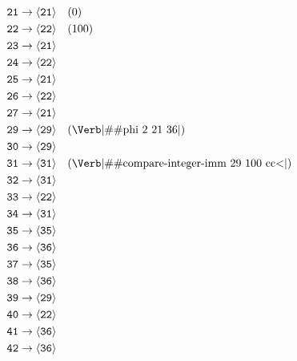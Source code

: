 \begin{align*}
  \texttt{21} &\to \vn{21} \quad (0)                                                \\
  \texttt{22} &\to \vn{22} \quad (100)                                              \\
  \texttt{23} &\to \vn{21}                                                          \\
  \texttt{24} &\to \vn{22}                                                          \\
  \texttt{25} &\to \vn{21}                                                          \\
  \texttt{26} &\to \vn{22}                                                          \\
  \texttt{27} &\to \vn{21}                                                          \\
  \texttt{29} &\to \vn{29} \quad (\text{\Verb|\#\#phi 2 21 36|})                    \\
  \texttt{30} &\to \vn{29}                                                          \\
  \texttt{31} &\to \vn{31} \quad (\text{\Verb|\#\#compare-integer-imm 29 100 cc<|}) \\
  \texttt{32} &\to \vn{31}                                                          \\
  \texttt{33} &\to \vn{22}                                                          \\
  \texttt{34} &\to \vn{31}                                                          \\
  \texttt{35} &\to \vn{35}                                                          \\
  \texttt{36} &\to \vn{36}                                                          \\
  \texttt{37} &\to \vn{35}                                                          \\
  \texttt{38} &\to \vn{36}                                                          \\
  \texttt{39} &\to \vn{29}                                                          \\
  \texttt{40} &\to \vn{22}                                                          \\
  \texttt{41} &\to \vn{36}                                                          \\
  \texttt{42} &\to \vn{36}
\end{align*}

